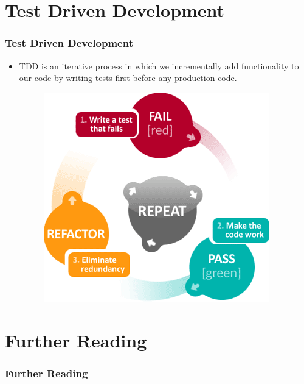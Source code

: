 \documentclass[10pt,t,xcolor=dvipsnames]{beamer}
\begin{document}
\section{Test Driven Development}
\begin{frame}[fragile]
\frametitle{Test Driven Development}
\pause
\begin{itemize}[<+->]
\item TDD is an \alert{iterative} process in which we \alert{incrementally} add functionality to our code by \alert{writing tests first} before any production code.
\begin{figure}
\centering
\includegraphics[scale=0.4]{../images/tdd-red-green-refactor-diagram.png} 
\end{figure}
\end{itemize}
\end{frame}
\section{Further Reading}
\begin{frame}
\frametitle{Further Reading}


\end{frame}
\end{document}
